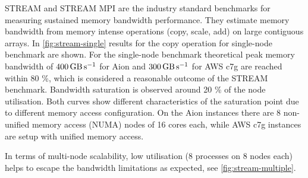 STREAM and STREAM MPI \citep{McCalpin1995,McCalpin2007} are the industry
standard benchmarks for measuring sustained memory bandwidth performance. They
estimate memory bandwidth from memory intense operations (copy, scale, add) on
large contiguous arrays. In \autoref{fig:stream-single} results for the copy
operation for single-node benchmark are shown. For the single-node benchmark
theoretical peak memory bandwidth of $\SI{400}{\giga\byte\per\second}$ for Aion
and $\SI{300}{\giga\byte\per\second}$ for AWS c7g are reached within 80 \%,
which is considered a reasonable outcome of the STREAM benchmark. Bandwidth
saturation is observed around 20 \% of the node utilisation. Both curves show
different characteristics of the saturation point due to different memory
access configuration. On the Aion instances there are 8 non-unified memory
access (NUMA) nodes of 16 cores each, while AWS c7g instances are setup with
unified memory access.

In terms of multi-node scalability, low utilisation (8 processes on 8 nodes
each) helps to escape the bandwidth limitations as expected, see
\autoref{fig:stream-multiple}.

